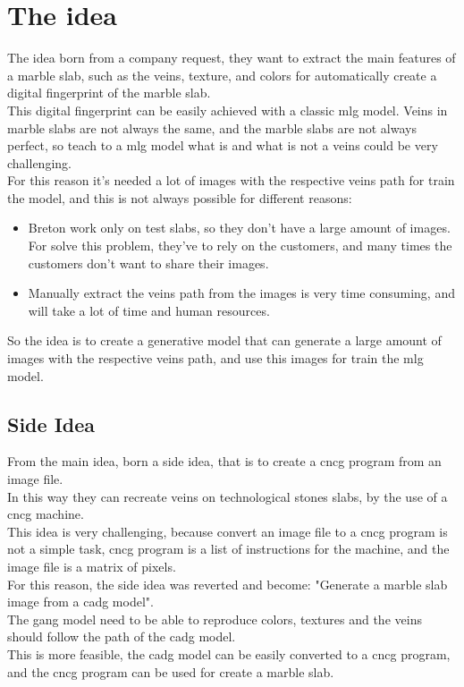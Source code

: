 \section{The idea}
The idea born from a company request, they want to extract the main features of a marble slab, such as the veins, texture, and colors for automatically create a digital fingerprint of the marble slab.\\
This digital fingerprint can be easily achieved with a classic \gls{mlg} model. Veins in marble slabs are not always the same, and the marble slabs are not always perfect, so teach to a \gls{mlg} model what is and what is not a veins could be very challenging.\\
For this reason it's needed a lot of images with the respective veins path for train the model, and this is not always possible for different reasons:
\begin{itemize}
    \item Breton work only on test slabs, so they don't have a large amount of images. 
    For solve this problem, they've to rely on the customers, and many times the customers don't want to share their images.
    \item Manually extract the veins path from the images is very time consuming, and will take a lot of time and human resources.
\end{itemize}
So the idea is to create a generative model that can generate a large amount of images with the respective veins path, and use this images for train the \gls{mlg} model.\\
\subsection{Side Idea}
From the main idea, born a side idea, that is to create a \gls{cncg} program from an image file.\\
In this way they can recreate veins on technological stones slabs, by the use of a \gls{cncg} machine.\\
This idea is very challenging, because convert an image file to a \gls{cncg} program is not a simple task, \gls{cncg} program is a list of instructions for the machine, and the image file is a matrix of pixels.\\
For this reason, the side idea was reverted and become: "Generate a marble slab image from a \gls{cadg} model".\\
The \gls{gang} model need to be able to reproduce colors, textures and the veins should follow the path of the \gls{cadg} model.\\
This is more feasible, the \gls{cadg} model can be easily converted to a \gls{cncg} program, and the \gls{cncg} program can be used for create a marble slab.\\

